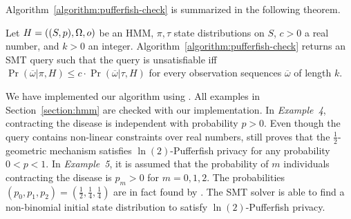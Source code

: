 Algorithm~\ref{algorithm:pufferfish-check} is summarized in the
following theorem. 

\begin{theorem}
  Let $H = ((S, p), \Omega, o)$ be an HMM, $\pi, \tau$ state
  distributions on $S$, $c > 0$ a real number, and $k > 0$ an
  integer. Algorithm~\ref{algorithm:pufferfish-check} returns an SMT
  query such that the query is unsatisfiable iff
  $\Pr (\overline{\omega} | \pi, H) \leq c \cdot
  \Pr (\overline{\omega} | \tau, H)$ for every observation
  sequences $\overline{\omega}$ of length $k$.
\end{theorem}


We have implemented our algorithm using \zpython. All examples in
Section~\ref{section:hmm} are checked with our implementation. In
\textit{Example~4}, contracting the disease is independent with
probability $p > 0$. Even though the query contains non-linear
constraints over real numbers, \zpython still proves that the
$\frac{1}{2}$-geometric mechanism satisfies $\ln(2)$-Pufferfish
privacy for any probability $0 < p < 1$. In \textit{Example~5}, it is
assumed that the probability of $m$ individuals contracting the
disease is $p_m > 0$ for $m = 0, 1, 2$. The probabilities $(p_0, p_1,
p_2) = (\frac{1}{2}, \frac{1}{4}, \frac{1}{4})$ are in fact found by
\zpython. The SMT solver is able to find a non-binomial initial state
distribution to satisfy $\ln(2)$-Pufferfish privacy. 